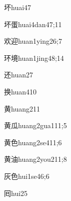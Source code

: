 \begin{verbete}{坏}{huai4}{7}
\end{verbete}

\begin{verbete}{坏蛋}{huai4dan4}{7;11}
\end{verbete}

\begin{verbete}{欢迎}{huan1ying2}{6;7}
\end{verbete}

\begin{verbete}{环境}{huan1jing4}{8;14}
\end{verbete}

\begin{verbete}{还}{huan2}{7}
\end{verbete}

\begin{verbete}{换}{huan4}{10}
\end{verbete}

\begin{verbete}{黄}{huang2}{11}
\end{verbete}

\begin{verbete}{黄瓜}{huang2gua1}{11;5}
\end{verbete}

\begin{verbete}{黄色}{huang2se4}{11;6}
\end{verbete}

\begin{verbete}{黄油}{huang2you2}{11;8}
\end{verbete}

\begin{verbete}{灰色}{hui1se4}{6;6}
\end{verbete}

\begin{verbete}{囘}{hui2}{5}
\end{verbete}

